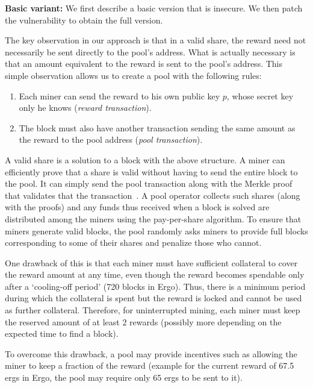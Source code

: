 \documentclass{llncs}
\newcommand{\authnote}[2]{\marginpar{\parbox{\marginparwidth}{\tiny %
  \textsf{#1 {\textcolor{blue}{notes: #2}}}}}%
  \textcolor{blue}{\textbf{\dag}}}
\newcommand{\authnote}[2]{
  \textsf{#1 \textcolor{blue}{: #2}}}
\newcommand{\authnote}[2]{}
\newcommand{\snote}[1]{{\authnote{\textcolor{red}{Scalahub notes}}{#1}}}
\begin{document}
\textbf{Basic variant:} We first describe a basic version that is insecure. We then patch the vulnerability to obtain the full version.

The key observation in our approach is that in a valid share, the reward need not necessarily be sent directly to the pool's address. What is actually necessary is that an amount equivalent to the reward is sent to the pool's address. This simple observation allows us to create a pool with the following rules:
\begin{enumerate}
	\item Each miner can send the reward to his own public key $p$, whose secret key only he knows ({\em reward transaction}).
	\item The block must also have another transaction sending the same amount as the reward to the pool address ({\em pool transaction}). 

\end{enumerate}


A valid share is a solution to a block with the above structure. A miner can efficiently prove that a share is valid without having to send the entire block to the pool. It can simply send the pool transaction along with the Merkle proof that validates that the transaction~\cite{Hearn:2012:BIP}.
A pool operator collects such shares (along with the proofs) and any funds thus received when a block is solved are distributed among the miners using the pay-per-share algorithm. To ensure that miners generate valid blocks, the pool randomly asks miners to provide full blocks corresponding to some of their shares and penalize those who cannot. 

One drawback of this is that each miner must have sufficient collateral to cover the reward amount at any time, even though the reward becomes spendable only after a `cooling-off period' (720 blocks in Ergo). Thus, there is a minimum period during which the collateral is spent but the reward is locked and cannot be used as further collateral. 
Therefore, for uninterrupted mining, each miner must keep the reserved amount of at least 2 rewards (possibly more depending on the expected time to find a block).

 To overcome this drawback, a pool may provide incentives such as allowing the miner to keep a fraction of the reward (example for the current reward of 67.5 ergs in Ergo, the pool may require only 65 ergs to be sent to it). 
\end{document}

